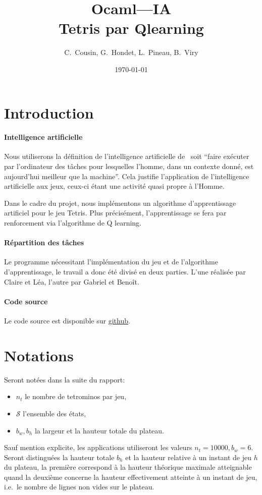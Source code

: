 \documentclass{report}
\title{Ocaml---IA\\Tetris par Qlearning}
\author{C.~Cousin, G.~Hondet, L.~Pineau, B.~Viry}
\date{\today}
\begin{document}
\maketitle
\tableofcontents

\section*{Introduction}
\paragraph{Intelligence artificielle}
Nous utiliserons la définition de l'intelligence artificielle
de~\cite{schiex_alliot92} soit
``faire exécuter par l'ordinateur des tâches pour lesquelles l'homme, dans un
contexte donné, est aujourd'hui meilleur que la machine''. Cela justifie
l'application de l'intelligence artificielle aux jeux, ceux-ci étant une
activité quasi propre à l'Homme.

Dans le cadre du projet, nous implémentons un algorithme d'apprentissage
artificiel pour le jeu Tetris. Plus précisément, l'apprentissage se fera par
renforcement via l'algorithme de Q learning.

\paragraph{Répartition des tâches}
Le programme nécessitant l'implémentation du jeu et de l'algorithme
d'apprentissage, le travail a donc été divisé en deux parties. L'une réalisée
par Claire et L\'ea, l'autre par Gabriel et Beno\^it.

\paragraph{Code source}
Le code source est disponible sur
\href{https://github.com/ViryBe/qai_tetris}{github}.


\section*{Notations}
Seront notées dans la suite du rapport:
\begin{itemize}
  \item \(n_t\) le nombre de tetrominos par jeu,
  \item \(\mathcal{S}\) l'ensemble des états,
  \item \(b_w, b_h\) la largeur et la hauteur totale du plateau.
\end{itemize}
Sauf mention explicite, les applications utiliseront les valeurs \(n_t=10000,
b_w = 6\). Seront distinguées la hauteur totale \(b_h\) et la hauteur relative
à un instant de jeu \(h\) du plateau, la première correspond à la hauteur
théorique maximale atteignable quand la deuxième concerne la hauteur
effectivement atteinte à un instant de jeu, i.e.\ le nombre de lignes non vides
sur le plateau.
\end{document}
